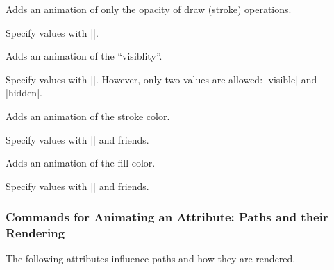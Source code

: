 \begin{command}{\pgfsys@animatestrokeopacity}
  Adds an animation of only the opacity of draw (stroke) operations.
  
  Specify values with |\pgfsys@animation@scalar|.
  
\begin{codeexample}[width=2cm]
\end{codeexample}
\end{command}

\begin{command}{\pgfsys@animatevisibility}
  Adds an animation of the ``visiblity''.
  
  Specify values with |\pgfsys@animation@text|. However, only two values are allowed:
  |visible| and |hidden|.
\begin{codeexample}[width=2cm]
\end{codeexample}
\end{command}

\begin{command}{\pgfsys@animatestrokecolor}
  Adds an animation of the stroke color.

  Specify values with |\pgfsys@animation@color@rgb| and friends.
\begin{codeexample}[width=2cm]
\end{codeexample}
\end{command}

\begin{command}{\pgfsys@animatefillcolor}
  Adds an animation of the fill color.
  
  Specify values with |\pgfsys@animation@color@rgb| and friends.
\begin{codeexample}[width=2cm]
\end{codeexample}
\end{command}


\subsubsection{Commands for Animating an Attribute: Paths and their Rendering}

The following attributes influence paths and how they are rendered.

